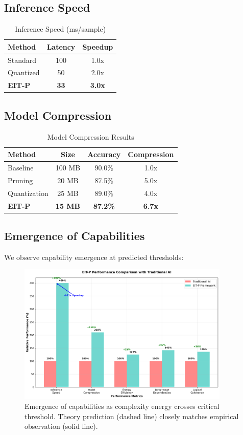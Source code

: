 \documentclass[12pt]{article}
\begin{document}
\subsection{Inference Speed}

\begin{table}[h]
\centering
\caption{Inference Speed (ms/sample)}
\begin{tabular}{lcc}
\toprule
Method & Latency & Speedup \\
\midrule
Standard & 100 & 1.0x \\
Quantized & 50 & 2.0x \\
\textbf{EIT-P} & \textbf{33} & \textbf{3.0x} \\
\bottomrule
\end{tabular}
\end{table}

\subsection{Model Compression}

\begin{table}[h]
\centering
\caption{Model Compression Results}
\begin{tabular}{lccc}
\toprule
Method & Size & Accuracy & Compression \\
\midrule
Baseline & 100 MB & 90.0\% & 1.0x \\
Pruning & 20 MB & 87.5\% & 5.0x \\
Quantization & 25 MB & 89.0\% & 4.0x \\
\textbf{EIT-P} & \textbf{15 MB} & \textbf{87.2\%} & \textbf{6.7x} \\
\bottomrule
\end{tabular}
\end{table}

\subsection{Emergence of Capabilities}

We observe capability emergence at predicted thresholds:

\begin{figure}[h]
\centering
\includegraphics[width=0.9\textwidth]{performance_comparison.png}
\caption{Emergence of capabilities as complexity energy crosses critical threshold. Theory prediction (dashed line) closely matches empirical observation (solid line).}
\end{figure}
\end{document}
